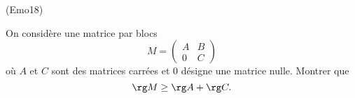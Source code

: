 \begin{tiny}(Emo18)\end{tiny} On considère une matrice par blocs
\begin{displaymath}
 M = 
\begin{pmatrix}
A & B \\ 0 & C 
\end{pmatrix}
\end{displaymath}
où $A$ et $C$ sont des matrices carrées et $0$ désigne une matrice nulle. Montrer que
\begin{displaymath}
 \rg M \geq \rg A + \rg C.
\end{displaymath}
